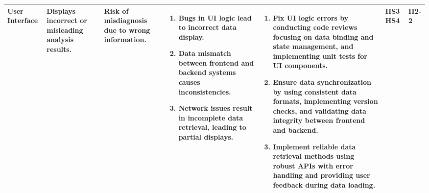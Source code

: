 \documentclass{article}
\begin{document}
\begin{landscape}
\begin{table}[ht]
{\begin{tabular}{|p{2.5cm}|p{2.5cm}|p{3cm}|p{5cm}|p{6cm}|p{1cm}|p{1cm}|}
    User Interface
     & Displays incorrect or misleading analysis results.
     & Risk of misdiagnosis due to wrong information.
     &
     \begin{enumerate}[leftmargin=*, label={\alph*.}, itemsep=1pt]
         \item Bugs in UI logic lead to incorrect data display.
         \item Data mismatch between frontend and backend systems causes inconsistencies.
         \item Network issues result in incomplete data retrieval, leading to partial displays.
     \end{enumerate}
     &
     \begin{enumerate}[leftmargin=*, label={\alph*.}, itemsep=1pt]
         \item Fix UI logic errors by conducting code reviews focusing on data binding and state management, and implementing unit tests for UI components.
         \item Ensure data synchronization by using consistent data formats, implementing version checks, and validating data integrity between frontend and backend.
         \item Implement reliable data retrieval methods using robust APIs with error handling and providing user feedback during data loading.
     \end{enumerate}
     & HS3 \newline HS4 & H2-2 \\ \hline

    \end{tabular}
    }
    \end{table}
\end{landscape}
\end{document}
